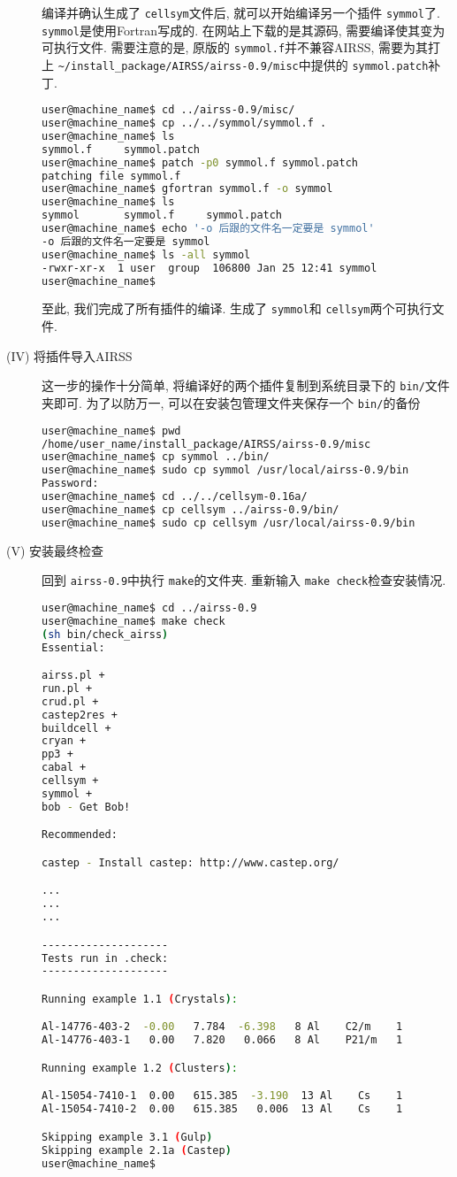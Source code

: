 \documentclass[a4paper, 10pt]{article}
\begin{document}
\begin{description}
编译并确认生成了 \verb|cellsym|文件后, 就可以开始编译另一个插件 \verb|symmol|了.
 \verb|symmol|是使用Fortran写成的. 在网站上下载的是其源码, 需要编译使其变为可执行文件.
需要注意的是, 原版的 \verb|symmol.f|并不兼容AIRSS, 需要为其打上 \verb|~/install_package/AIRSS/airss-0.9/misc|中提供的 \verb|symmol.patch|补丁.
\begin{lstlisting}[language={bash}]
user@machine_name$ cd ../airss-0.9/misc/
user@machine_name$ cp ../../symmol/symmol.f .
user@machine_name$ ls
symmol.f     symmol.patch
user@machine_name$ patch -p0 symmol.f symmol.patch 
patching file symmol.f
user@machine_name$ gfortran symmol.f -o symmol 
user@machine_name$ ls 
symmol       symmol.f     symmol.patch
user@machine_name$ echo '-o 后跟的文件名一定要是 symmol'
-o 后跟的文件名一定要是 symmol
user@machine_name$ ls -all symmol
-rwxr-xr-x  1 user  group  106800 Jan 25 12:41 symmol
user@machine_name$
\end{lstlisting}

至此, 我们完成了所有插件的编译. 生成了 \verb|symmol|和 \verb|cellsym|两个可执行文件.

\item[(IV) 将插件导入AIRSS]
这一步的操作十分简单, 将编译好的两个插件复制到系统目录下的 \verb|bin/|文件夹即可. 为了以防万一, 可以在安装包管理文件夹保存一个 \verb|bin/|的备份
\begin{lstlisting}[language={bash}]
user@machine_name$ pwd
/home/user_name/install_package/AIRSS/airss-0.9/misc
user@machine_name$ cp symmol ../bin/
user@machine_name$ sudo cp symmol /usr/local/airss-0.9/bin
Password:
user@machine_name$ cd ../../cellsym-0.16a/
user@machine_name$ cp cellsym ../airss-0.9/bin/
user@machine_name$ sudo cp cellsym /usr/local/airss-0.9/bin
\end{lstlisting}

\item[(V) 安装最终检查]
回到 \verb|airss-0.9|中执行 \verb|make|的文件夹. 重新输入 \verb|make check|检查安装情况.
\begin{lstlisting}[language={bash}]
user@machine_name$ cd ../airss-0.9
user@machine_name$ make check
(sh bin/check_airss)
Essential:

airss.pl +
run.pl +
crud.pl +
castep2res +
buildcell +
cryan +
pp3 +
cabal +
cellsym +
symmol +
bob - Get Bob!

Recommended:

castep - Install castep: http://www.castep.org/

...
...
...

--------------------
Tests run in .check:
--------------------

Running example 1.1 (Crystals):

Al-14776-403-2  -0.00   7.784  -6.398   8 Al    C2/m    1
Al-14776-403-1   0.00   7.820   0.066   8 Al    P21/m   1

Running example 1.2 (Clusters):

Al-15054-7410-1  0.00   615.385  -3.190  13 Al    Cs    1
Al-15054-7410-2  0.00   615.385   0.006  13 Al    Cs    1

Skipping example 3.1 (Gulp)
Skipping example 2.1a (Castep)
user@machine_name$
\end{lstlisting}
\end{description}
\end{document}
